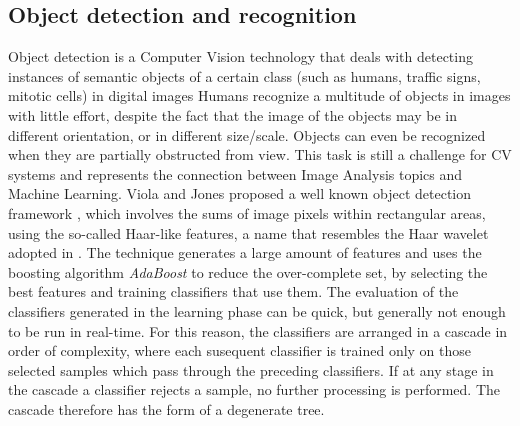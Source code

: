 \subsection{Object detection and recognition}

Object detection is a Computer Vision technology that deals with detecting instances of semantic objects of a certain class (such as humans, traffic signs, mitotic cells) in digital images
Humans recognize a multitude of objects in images with little effort, despite the fact that the image of the objects may be in different orientation,
or in different size/scale. Objects can even be recognized when they are partially obstructed from view.
This task is still a challenge for \Gls{CV} systems and represents the connection between Image Analysis topics and Machine Learning.
Viola and Jones proposed a well known object detection framework \cite{objDetect04ViolaJones, objDetect05ViolaJonesRapid}, which involves the sums
of image pixels within rectangular areas, using the so-called Haar-like features, a name that resembles the Haar wavelet adopted in \cite{objDetect03framework}.
The technique generates a large amount of features and uses the boosting algorithm \textit{AdaBoost} to reduce the over-complete set, by selecting the best features and training classifiers that use them.
The evaluation of the classifiers generated in the learning phase can be quick, but generally not enough to be run in real-time. For this reason, the classifiers are arranged in a cascade in order of complexity,
where each susequent classifier is trained only on those selected samples which pass through the preceding classifiers.
If at any stage in the cascade a classifier rejects a sample, no further processing is performed.
The cascade therefore has the form of a degenerate tree.


\vspace{0.5cm}


